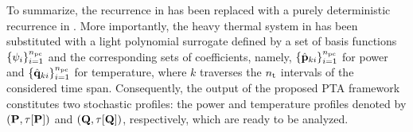 To summarize, the recurrence in  has been replaced with a
purely deterministic recurrence in . More importantly, the
heavy thermal system in  has been substituted with a light
polynomial surrogate defined by a set of basis functions $\{ \psi_i \}_{i =
1}^{n_\text{pc}}$ and the corresponding sets of coefficients, namely, $\{
\hat{\mathbf{p}}_{ki} \}_{i = 1}^{n_\text{pc}}$ for power and $\{ \hat{\mathbf{q}}_{ki} \}_{i =
1}^{n_\text{pc}}$ for temperature, where $k$ traverses the ${n_\text{t}}$ intervals of the
considered time span. Consequently, the output of the proposed PTA framework
constitutes two stochastic profiles: the power and temperature profiles denoted
by $\profileP$ and $\profileT$, respectively, which are ready to be analyzed.
